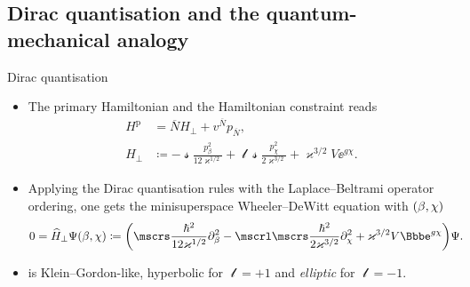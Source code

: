 \documentclass[8pt]{beamer}
\begin{document}
\subsection{Dirac quantisation and the quantum-mechanical analogy}

\begin{frame}%
{Dirac quantisation}%
\begin{itemize}
\item
The primary Hamiltonian and the Hamiltonian
constraint reads
\begin{align}
H^\text{p} &= \overline{N}H_\perp + v^{\overline{N}} p_{\overline{N}},
\\
H_\perp &\coloneqq -\mscrs\frac{p_\beta^2}{12\varkappa^{1/2}}
+\mscrl\mscrs\frac{p_\chi^2}{2\varkappa^{3/2}}
+\varkappa^{3/2}V\ee^{g\chi}.
\end{align}
\item
Applying the Dirac quantisation rules with the Laplace--Beltrami
operator ordering, one 
gets the minisuperspace Wheeler--DeWitt equation with ${\left(\beta,\chi\right)}$
\begin{align}
0 &= \widehat{H}_\perp \rfun{\Psi}{\beta,\chi} \coloneqq
\rbr{\mscrs\frac{\hslash^2}{12\varkappa^{1/2}}\partial_{\beta}^2
-\mscrl\mscrs\frac{\hslash^2}{2\varkappa^{3/2}}\partial_{\chi}^2
+\varkappa^{3/2}V\ee^{g \chi}}\Psi.
\label{eq:WDW-10}
\end{align}
\item
{} is Klein--Gordon-like, hyperbolic for $\mscrl = +1$ and 
\emph{elliptic} for $\mscrl = -1$.
\end{itemize}
\end{frame}
\end{document}
